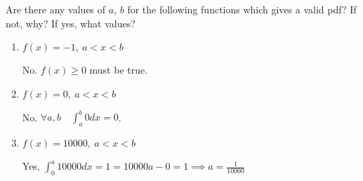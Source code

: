 \question Are there any values of $a$, $b$ for the following functions 
which gives a valid pdf? If not, why? If yes, what values?

\begin{enumerate}[label=(\alph*)]
\item $f(x) = -1,\ a < x < b$
\begin{solution}[.3cm]
No. $f(x) \ge 0$ must be true.
\end{solution}
\item $f(x) = 0, \ a<x<b$ 
\begin{solution}[.3cm]
No. $\forall a, b \quad \int_{a}^{b} 0 dx = 0$.
\end{solution}
\item $f(x) = 10000,\ a<x<b $
\begin{solution}[.3cm]
Yes, $\int_{0}^{a} 10000 dx = 1 = 10000a - 0 = 1 \implies a = \frac{1}{10000}$
\end{solution}
\end{enumerate}

